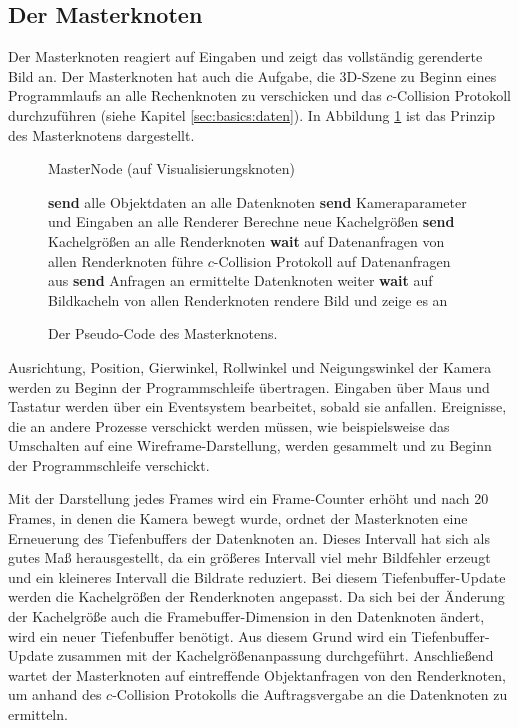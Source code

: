 \subsection{Der Masterknoten}
\label{sec:impl:master}
Der Masterknoten reagiert auf Eingaben und zeigt das vollständig gerenderte Bild an. Der Masterknoten hat auch die Aufgabe, die 3D-Szene zu Beginn eines Programmlaufs an alle Rechenknoten zu verschicken und das $c$-Collision Protokoll durchzuführen (siehe Kapitel \ref{sec:basics:daten}). In Abbildung \ref{fig:impl:masternode} ist das Prinzip des Masterknotens dargestellt. 
\begin{figure}[h]
\centering
 \begin{minipage}[t]{12.5cm}
\begin{algorithm}[H]
  \caption{MasterNode (auf Visualisierungsknoten)\label{alg:impl:masternode}} 
    \begin{algorithmic} [1]
      \STATE \textbf{send} alle Objektdaten an alle Datenknoten
	\STATE \textbf{send} Kameraparameter und Eingaben an alle Renderer
	  \STATE Berechne neue Kachelgrößen
	  \STATE \textbf{send} Kachelgrößen an alle Renderknoten
	\ENDIF
	\STATE \textbf{wait} auf Datenanfragen von allen Renderknoten
	\STATE führe $c$-Collision Protokoll auf Datenanfragen aus
	\STATE \textbf{send} Anfragen an ermittelte Datenknoten weiter
	\STATE \textbf{wait} auf Bildkacheln von allen Renderknoten
	\STATE rendere Bild und zeige es an
      \ENDWHILE
    \end{algorithmic}
\end{algorithm}
 \end{minipage}
\caption{\label{fig:impl:masternode}Der Pseudo-Code des Masterknotens.}
\end{figure}

Ausrichtung, Position, Gierwinkel, Rollwinkel und Neigungswinkel der Kamera werden zu Beginn der Programmschleife übertragen. Eingaben über Maus und Tastatur werden über ein Eventsystem bearbeitet, sobald sie anfallen. Ereignisse, die an andere Prozesse verschickt werden müssen, wie beispielsweise das Umschalten auf eine Wireframe-Darstellung, werden gesammelt und zu Beginn der Programmschleife verschickt. 

Mit der Darstellung jedes Frames wird ein Frame-Counter erhöht und nach 20 Frames, in denen die Kamera bewegt wurde, ordnet der Masterknoten eine Erneuerung des Tiefenbuffers der Datenknoten an. Dieses Intervall hat sich als gutes Maß herausgestellt, da ein größeres Intervall viel mehr Bildfehler erzeugt  und ein kleineres Intervall die Bildrate reduziert. Bei diesem Tiefenbuffer-Update werden die Kachelgrößen der Renderknoten angepasst. Da sich bei der Änderung der Kachelgröße auch die Framebuffer-Dimension in den Datenknoten ändert, wird ein neuer Tiefenbuffer benötigt. Aus diesem Grund wird ein Tiefenbuffer-Update zusammen mit der Kachelgrößenanpassung durchgeführt. Anschließend wartet der Masterknoten auf eintreffende Objektanfragen von den Renderknoten, um anhand des $c$-Collision Protokolls die Auftragsvergabe an die Datenknoten zu ermitteln.

